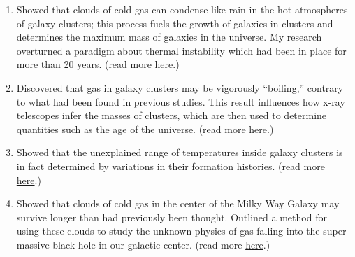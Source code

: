 \documentclass[11pt]{article}
\newenvironment{outerlist}[1][\enskip\textbullet]%
        {\begin{enumerate}[#1]}{\end{enumerate}%
         \vspace{-.6\baselineskip}}
\begin{document}
\begin{outerlist}
  \item Showed that clouds of cold gas can condense like rain in the
    hot atmospheres of galaxy clusters; this process fuels the growth
    of galaxies in clusters and determines the maximum mass of
    galaxies in the universe.  My research overturned a paradigm about
    thermal instability which had been in place for more than 20
    years. (read more \href{http://mkmcc.github.io/research/#sec:ti}{here}.)
  \item Discovered that gas in galaxy clusters may be vigorously
    ``boiling,'' contrary to what had been found in previous studies.
    This result influences how x-ray telescopes infer the masses of clusters,
    which are then used to determine quantities such as the age of the
    universe.  (read more
    \href{http://mkmcc.github.io/research/#sec:mti}{here}.)
  \item Showed that the unexplained range of temperatures inside
    galaxy clusters is in fact determined by variations in their
    formation histories. (read more \href{http://mkmcc.github.io/research/#sec:outer-parts}{here}.)
  \item Showed that clouds of cold gas in the center of the Milky Way
    Galaxy may survive longer than had previously been thought.
    Outlined a method for using these clouds to study the unknown
    physics of gas falling into the super-massive black hole in our
    galactic center. (read more \href{http://mkmcc.github.io/research/#sec:g2}{here}.)
\end{outerlist}

\restoregeometry
\end{document}
